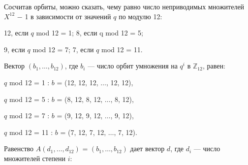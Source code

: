 Сосчитав орбиты, можно сказать, чему равно число неприводимых \linebreak
множителей $X^{12}$ $-$ 1 в зависимости от значений $q$ по модулю 12:

\begin{flushleft}
\hspace{50pt}12, \hspace{7pt} если $q$ mod 12 = 1; \hspace{7pt} 8, \hspace{7pt} если q mod 12 = 5; \ 

\vspace{5pt}\hspace{100pt}9, \hspace{7pt} если $q$ mod 12 = 7; \hspace{7pt} 7, \hspace{7pt} если $q$ mod 12 = 11.
\end{flushleft}

\noindent Вектор $(b_{1}, \dots, b_{12})$, где $b_{i}$ --- число орбит умножения на $q^{i}$ в $\mathbb Z_12$, равен:

\begin{flushleft}
\hspace{88pt}$q$ mod 12 = 1 : \hspace{5pt} $b$ = (12, 12, 12, $\dots$, 12, 12), \ 

\vspace{0pt}\hspace{88pt}$q$ mod 12 = 5 : \hspace{5pt} $b$ = (8, 12, 8, 12, $\dots$, 8, 12), \ 

\vspace{0pt}\hspace{88pt}$q$ mod 12 = 7 : \hspace{5pt} $b$ = (9, 12, 9, 12, $\dots$, 9, 12), \ 

\vspace{0pt}\hspace{88pt}$q$ mod 12 = 11 : \hspace{5pt} $b$ = (7, 12, 7, 12, $\dots$, 7, 12).
\end{flushleft}

\noindent Равенство $A(d_{1}, \dots, d_{12})$ = $(b_{1}, \dots, b_{12})$  дает вектор $d$, где $d_{i}$ --- число \linebreak
множителей степени $i$:

